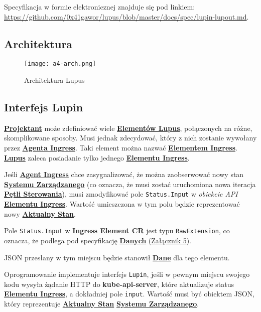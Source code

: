 \label{appendix:4}

Specyfikacja w formie elektronicznej znajduje się pod linkiem: \url{https://github.com/0x41gawor/lupus/blob/master/docs/spec/lupin-lupout.md}.

\subsection{Architektura}

\begin{figure}[!h]
    \centering \texttt{[image: a4-arch.png]}
    \caption{Architektura Lupus}\label{fig:a4-arch}
\end{figure}

\subsection{Interfejs Lupin}

\hyperlink{def:projektant}{\textbf{Projektant}} może zdefiniować wiele \hyperlink{def:element-lupus}{\textbf{Elementów Lupus}}, połączonych na różne, skomplikowane sposoby. Musi jednak zdecydować, który z nich zostanie wywołany przez \hyperlink{def:agent-ingress}{\textbf{Agenta Ingress}}. Taki element można nazwać \hyperlink{def:element-ingres}{\textbf{Elementem Ingress}}. \hyperlink{def:lupus}{\textbf{Lupus}} zaleca posiadanie tylko jednego \hyperlink{def:element-ingres}{\textbf{Elementu Ingress}}.

Jeśli \hyperlink{def:agent-ingress}{\textbf{Agent Ingress}} chce zasygnalizować, że można zaobserwować nowy stan \hyperlink{def:system-zarzadzany}{\textbf{Systemu Zarządzanego}} (co oznacza, że musi zostać uruchomiona nowa iteracja \hyperlink{def:zamknieta-petla-sterowania}{\textbf{Pętli Sterowania}}), musi zmodyfikować pole \texttt{Status.Input} w \textit{obiekcie API} \hyperlink{def:element-ingres}{\textbf{Elementu Ingress}}. Wartość umieszczona w tym polu będzie reprezentować nowy \hyperlink{def:stan-aktualny}{\textbf{Aktualny Stan}}.

Pole \texttt{Status.Input} w \hyperlink{def:element-ingres}{\textbf{Ingress Element CR}} jest typu \texttt{RawExtension}, co oznacza, że podlega pod specyfikację \hyperlink{def:dane}{\textbf{Danych}} (\hyperref[appendix:5]{Załącznik 5}).

JSON przesłany w tym miejscu będzie stanowił \hyperlink{def:dane}{\textbf{Dane}} dla tego elementu.

Oprogramowanie implementuje interfejs \texttt{Lupin}, jeśli w pewnym miejscu swojego kodu wysyła żądanie HTTP do \textbf{kube-api-server}, które aktualizuje status \hyperlink{def:element-ingres}{\textbf{Elementu Ingress}}, a dokładniej pole \texttt{input}. Wartość musi być obiektem JSON, który reprezentuje \hyperlink{def:stan-aktualny}{\textbf{Aktualny Stan}} \hyperlink{def:system-zarzadzany}{\textbf{Systemu Zarządzanego}}. 


